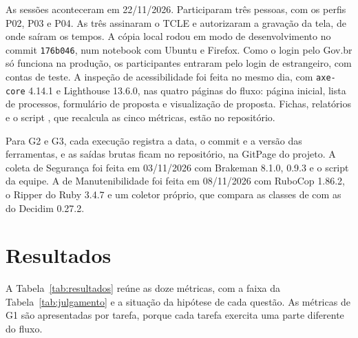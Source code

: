 \documentclass[journal]{IEEEtran}
\begin{document}
As sessões aconteceram em 22/11/2026. Participaram três pessoas, com os perfis P02, P03 e P04. As três assinaram o TCLE e autorizaram a gravação da tela, de onde saíram os tempos. A cópia local rodou em modo de desenvolvimento no commit \texttt{176b046}, num notebook com Ubuntu e Firefox. Como o login pelo Gov.br só funciona na produção, os participantes entraram pelo login de estrangeiro, com contas de teste. A inspeção de acessibilidade foi feita no mesmo dia, com \texttt{axe-core} 4.14.1 e Lighthouse 13.6.0, nas quatro páginas do fluxo: página inicial, lista de processos, formulário de proposta e visualização de proposta. Fichas, relatórios e o script , que recalcula as cinco métricas, estão no repositório.

Para G2 e G3, cada execução registra a data, o commit e a versão das ferramentas, e as saídas brutas ficam no repositório, na GitPage do projeto. A coleta de Segurança foi feita em 03/11/2026 com Brakeman 8.1.0,  0.9.3 e o script  da equipe. A de Manutenibilidade foi feita em 08/11/2026 com RuboCop 1.86.2, o Ripper do Ruby 3.4.7 e um coletor próprio, que compara as classes de  com as do Decidim 0.27.2.

\section{Resultados}
\label{sec:resultados}

A Tabela~\ref{tab:resultados} reúne as doze métricas, com a faixa da Tabela~\ref{tab:julgamento} e a situação da hipótese de cada questão. As métricas de G1 são apresentadas por tarefa, porque cada tarefa exercita uma parte diferente do fluxo.
\end{document}
